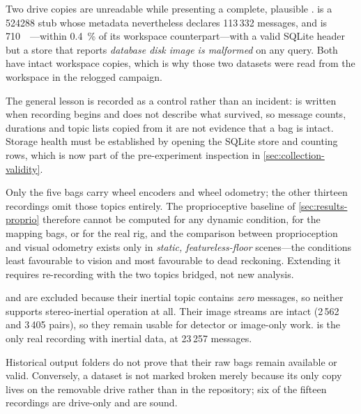 \begin{queried}
Two drive copies are unreadable while presenting a complete, plausible
.  is a
\SI{524288}{\byte} stub whose metadata nevertheless declares 113\,332 messages,
and  is \SI{710}{\mega\byte}---within
\SI{0.4}{\percent} of its workspace counterpart---with a valid SQLite header but a
store that reports \emph{database disk image is malformed} on any query. Both have
intact workspace copies, which is why those two datasets were read from the
workspace in the relogged campaign.

The general lesson is recorded as a control rather than an incident:
 is written when recording begins and does not describe what
survived, so message counts, durations and topic lists copied from it are not
evidence that a bag is intact. Storage health must be established by opening the
SQLite store and counting rows, which is now part of the pre-experiment inspection
in \cref{sec:collection-validity}.
\end{queried}

\begin{queried}
Only the five  bags carry wheel encoders and wheel
odometry; the other thirteen recordings omit those topics entirely. The
proprioceptive baseline of \cref{sec:results-proprio} therefore cannot be computed
for any dynamic condition, for the mapping bags, or for the real rig, and the
comparison between proprioception and visual odometry exists only in
\emph{static, featureless-floor} scenes---the conditions least favourable to
vision and most favourable to dead reckoning. Extending it requires re-recording
with the two topics bridged, not new analysis.
\end{queried}

\begin{queried}[Excluded]
 and  are excluded because their
inertial topic  contains \emph{zero} messages, so
neither supports stereo-inertial operation at all. Their image streams are intact
(2\,562 and 3\,405 pairs), so they remain usable for detector or image-only work.
 is the only real recording with inertial data, at 23\,257
messages.
\end{queried}

Historical output folders do not prove that their raw bags remain available or
valid. Conversely, a dataset is not marked broken merely because its only copy
lives on the removable drive rather than in the repository; six of the fifteen
recordings are drive-only and are sound.

